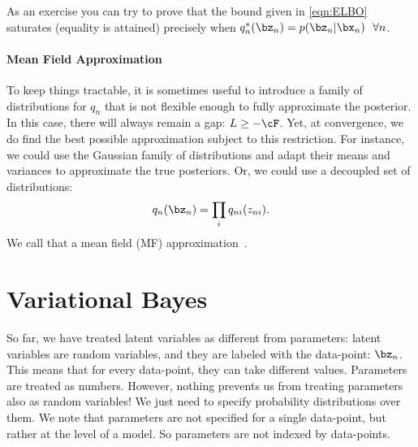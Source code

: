 \documentclass{lecture}
\begin{document}
As an exercise you can try to prove that the bound given in \cref{eqn:ELBO} saturates (equality is attained) precisely when $q_n^*(\bz_n)=p(\bz_n|\bx_n)~~\forall n$.

\paragraph{Mean Field Approximation}
To keep things tractable, it is sometimes useful to introduce a family of distributions for $q_n$ that is not flexible enough to fully approximate the posterior. In this case, there will always remain a gap: $L\geq -\cF$. Yet, at convergence, we do find the best possible approximation subject to this restriction. For instance, we could use the Gaussian family of distributions and adapt their means and variances to approximate the true posteriors. Or, we could use a decoupled set of distributions:
\begin{align}
	q_n(\bz_n) = \prod_i q_{ni}(z_{ni}).
\end{align}
We call that a mean field (MF) approximation~\cite{Parisi1988Statistical}.


\section{Variational Bayes}
So far, we have treated latent variables as different from parameters: latent variables are random variables, and they are labeled with the data-point: $\bz_n$. This means that for every data-point, they can take different values. Parameters are treated as numbers. However, nothing prevents us from treating parameters also as random variables! We just need to specify probability distributions over them. We note that parameters are not specified for a single data-point, but rather at the level of a model. So parameters are not indexed by data-points.
\end{document}
